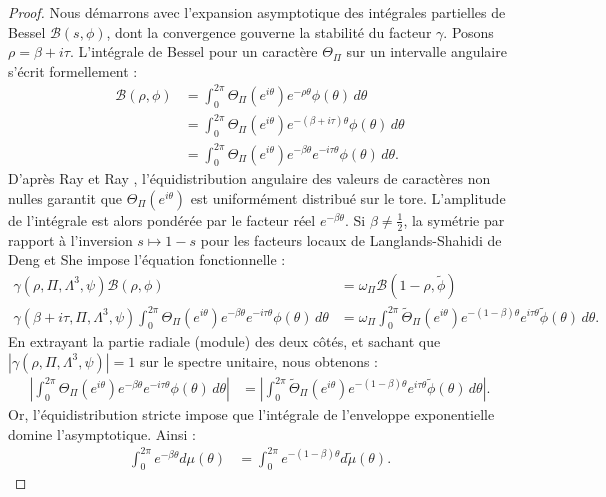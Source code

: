 \documentclass[
]{article}
\begin{document}
\begin{proof}
Nous démarrons avec l'expansion asymptotique des intégrales partielles de Bessel $\mathcal{B}(s, \phi)$, dont la convergence gouverne la stabilité du facteur $\gamma$. Posons $\rho = \beta + i\tau$. L'intégrale de Bessel pour un caractère $\Theta_{\Pi}$ sur un intervalle angulaire s'écrit formellement :
\begin{align*}
\mathcal{B}(\rho, \phi) &= \int_{0}^{2\pi} \Theta_{\Pi}(e^{i\theta}) e^{-\rho \theta} \phi(\theta) \, d\theta \\
&= \int_{0}^{2\pi} \Theta_{\Pi}(e^{i\theta}) e^{-(\beta + i\tau) \theta} \phi(\theta) \, d\theta \\
&= \int_{0}^{2\pi} \Theta_{\Pi}(e^{i\theta}) e^{-\beta \theta} e^{-i\tau \theta} \phi(\theta) \, d\theta.
\end{align*}
D'après Ray et Ray \cite{ray2026average}, l'équidistribution angulaire des valeurs de caractères non nulles garantit que $\Theta_{\Pi}(e^{i\theta})$ est uniformément distribué sur le tore. L'amplitude de l'intégrale est alors pondérée par le facteur réel $e^{-\beta \theta}$. Si $\beta \neq \frac{1}{2}$, la symétrie par rapport à l'inversion $s \mapsto 1-s$ pour les facteurs locaux de Langlands-Shahidi de Deng et She \cite{deng2026stability} impose l'équation fonctionnelle :
\begin{align*}
\gamma(\rho, \Pi, \Lambda^3, \psi) \mathcal{B}(\rho, \phi) &= \omega_{\Pi} \mathcal{B}(1-\rho, \tilde{\phi}) \\
\gamma(\beta + i\tau, \Pi, \Lambda^3, \psi) \int_{0}^{2\pi} \Theta_{\Pi}(e^{i\theta}) e^{-\beta \theta} e^{-i\tau \theta} \phi(\theta) \, d\theta &= \omega_{\Pi} \int_{0}^{2\pi} \tilde{\Theta}_{\Pi}(e^{i\theta}) e^{-(1-\beta) \theta} e^{i\tau \theta} \tilde{\phi}(\theta) \, d\theta.
\end{align*}
En extrayant la partie radiale (module) des deux côtés, et sachant que $|\gamma(\rho, \Pi, \Lambda^3, \psi)| = 1$ sur le spectre unitaire, nous obtenons :
\begin{align*}
\left| \int_{0}^{2\pi} \Theta_{\Pi}(e^{i\theta}) e^{-\beta \theta} e^{-i\tau \theta} \phi(\theta) \, d\theta \right| &= \left| \int_{0}^{2\pi} \tilde{\Theta}_{\Pi}(e^{i\theta}) e^{-(1-\beta) \theta} e^{i\tau \theta} \tilde{\phi}(\theta) \, d\theta \right|.
\end{align*}
Or, l'équidistribution stricte impose que l'intégrale de l'enveloppe exponentielle domine l'asymptotique. Ainsi :
\begin{align*}
\int_{0}^{2\pi} e^{-\beta \theta} d\mu(\theta) &= \int_{0}^{2\pi} e^{-(1-\beta) \theta} d\tilde{\mu}(\theta).

\end{align*}
\end{proof}
\end{document}
